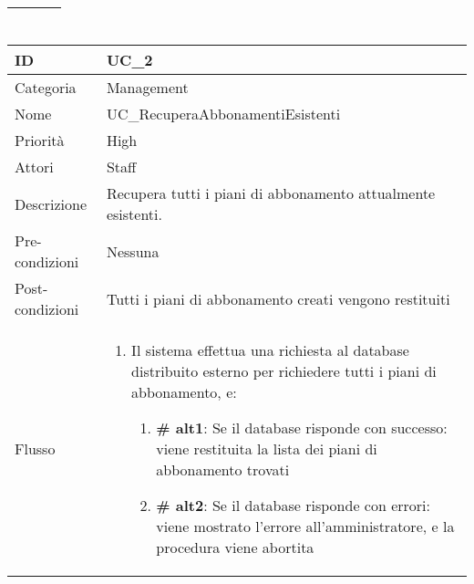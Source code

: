 \begin{center}
\begin{tabular}{ |p{2cm}|p{13cm}|  }
\begin{enumerate}
			\end{enumerate}\\\hline
\end{tabular}
\label{table_use_case:1}\newline

\begin{tabular}{ |p{2cm}|p{13cm}|  }
\hline
ID & UC\_2 \\\hline
Categoria & Management\\\hline
Nome & UC\_RecuperaAbbonamentiEsistenti\\\hline
Priorità & High \\\hline
Attori &  Staff \\\hline
Descrizione & Recupera tutti i piani di abbonamento attualmente esistenti.\\\hline
Pre-condizioni &  Nessuna \\\hline
Post-condizioni &  Tutti i piani di abbonamento creati vengono restituiti\\\hline
Flusso &  	\begin{enumerate}
			\item Il sistema effettua una richiesta al database distribuito esterno per richiedere tutti i piani di abbonamento, e:
				\begin{enumerate}[  ]
				\item \textbf{\# alt1}: Se il database risponde con successo: viene restituita la lista dei piani di abbonamento trovati
				\item \textbf{\# alt2}: Se il database risponde con errori: viene mostrato l'errore all'amministratore, e la procedura viene abortita
				\end{enumerate}
		\end{enumerate}\\\hline
\end{tabular}
\label{table_use_case:2}\newline


\end{center}
